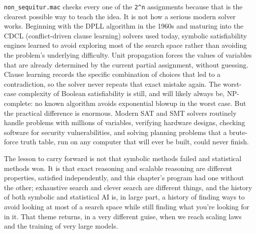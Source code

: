 \texttt{non\_sequitur.mac} checks every one of the \texttt{2\textasciicircum{}n} assignments because that is the clearest possible way to teach the idea. It is not how a serious modern solver works. Beginning with the DPLL algorithm in the 1960s and maturing into the CDCL (conflict-driven clause learning) solvers used today, symbolic satisfiability engines learned to avoid exploring most of the search space rather than avoiding the problem's underlying difficulty. Unit propagation forces the values of variables that are already determined by the current partial assignment, without guessing. Clause learning records the specific combination of choices that led to a contradiction, so the solver never repeats that exact mistake again. The worst-case complexity of Boolean satisfiability is still, and will likely always be, NP-complete: no known algorithm avoids exponential blowup in the worst case. But the practical difference is enormous. Modern SAT and SMT solvers routinely handle problems with millions of variables, verifying hardware designs, checking software for security vulnerabilities, and solving planning problems that a brute-force truth table, run on any computer that will ever be built, could never finish.

The lesson to carry forward is not that symbolic methods failed and statistical methods won. It is that exact reasoning and scalable reasoning are different properties, satisfied independently, and this chapter's program had one without the other; exhaustive search and clever search are different things, and the history of both symbolic and statistical AI is, in large part, a history of finding ways to avoid looking at most of a search space while still finding what you're looking for in it. That theme returns, in a very different guise, when we reach scaling laws and the training of very large models.
